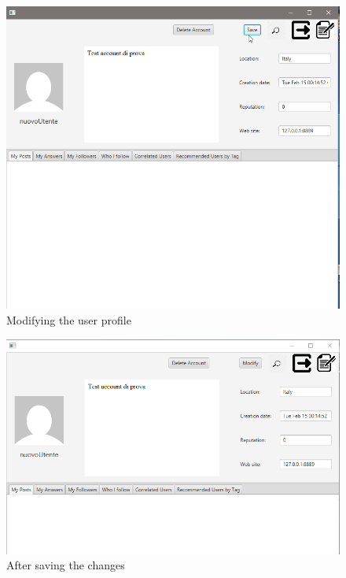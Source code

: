 \documentclass[11pt]{report}
\begin{document}
\begin{figure}[H]
  \centering
  \includegraphics[width=\textwidth,keepaspectratio=true]{img/user_manual/ModificaUtente2.png}
  \caption{Modifying the user profile}
  \label{fig:ModificaUtente2}
\end{figure}
\begin{figure}[H]
  \centering
  \includegraphics[width=\textwidth,keepaspectratio=true]{img/user_manual/ModificaUtente3.png}
  \caption{After saving the changes}
  \label{fig:ModificaUtente3}
\end{figure}
\end{document}

